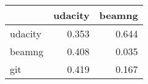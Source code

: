 \begin{tabular}{lrr}
\toprule
{} &  udacity &  beamng \\
\midrule
udacity &    0.353 &   0.644 \\
beamng  &    0.408 &   0.035 \\
git     &    0.419 &   0.167 \\
\bottomrule
\end{tabular}
